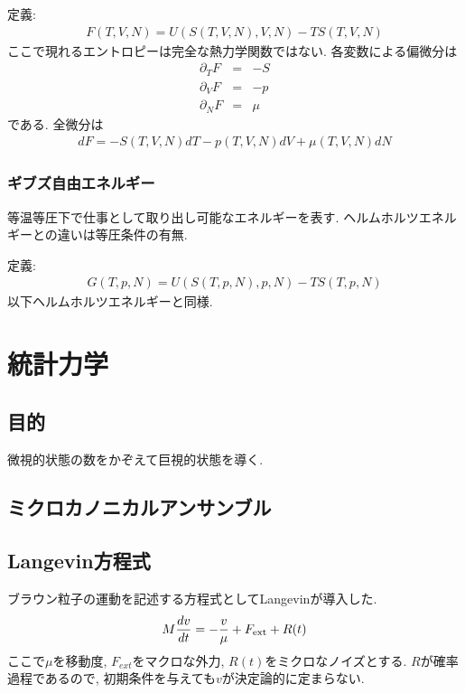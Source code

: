 \documentclass[10.5pt,a4paper]{jreport}
\begin{document}
定義:
\begin{eqnarray}
  F(T, V, N) = U(S(T, V, N), V, N) -TS(T, V, N)
\end{eqnarray}
ここで現れるエントロピーは完全な熱力学関数ではない. 各変数による偏微分は
\begin{eqnarray}
  \partial_TF &=& -S\\
  \partial_VF &=& -p\\
  \partial_NF &=& \mu
\end{eqnarray}
である. 全微分は
\begin{eqnarray}
  dF = -S(T, V, N)dT -p(T, V, N)dV + \mu(T, V, N) dN
\end{eqnarray}
\subsubsection{ギブズ自由エネルギー}
等温等圧下で仕事として取り出し可能なエネルギーを表す. ヘルムホルツエネルギーとの違いは等圧条件の有無.

定義:
\begin{eqnarray}
  G(T, p, N) = U(S(T, p, N), p, N) -TS(T, p, N)
\end{eqnarray}
以下ヘルムホルツエネルギーと同様.
\section{統計力学}
\subsection{目的}
微視的状態の数をかぞえて巨視的状態を導く. 
\subsection{ミクロカノニカルアンサンブル}
\subsection{Langevin方程式}
ブラウン粒子の運動を記述する方程式としてLangevinが導入した.
\begin{eqnarray}
  M\frac{dv}{dt} = -\frac{v}{\mu} + F_{\rm ext} + R(t)\label{Langevin}
\end{eqnarray}
ここで$\mu$を移動度, $F_{ext}$をマクロな外力, $R(t)$をミクロなノイズとする. $R$が確率過程であるので, 初期条件を与えても$v$が決定論的に定まらない. 
\end{document}
